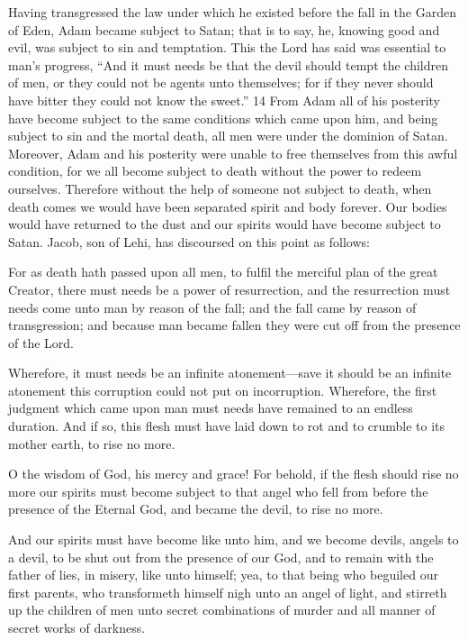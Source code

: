 Having transgressed the law under which he existed before the fall in the Garden of Eden,
Adam became subject to Satan; that is to say, he, knowing good and evil, was subject to sin
and temptation. This the Lord has said was essential to man's progress, ``And it must needs be
that the devil should tempt the children of men, or they could not be agents unto themselves;
for if they never should have bitter they could not know the sweet.'' 14 From Adam all of his
posterity have become subject to the same conditions which came upon him, and being
subject to sin and the mortal death, all men were under the dominion of Satan. Moreover,
Adam and his posterity were unable to free themselves from this awful condition, for we all
become subject to death without the power to redeem ourselves. Therefore without the help
of someone not subject to death, when death comes we would have been separated spirit and
body forever. Our bodies would have returned to the dust and our spirits would have become
subject to Satan. Jacob, son of Lehi, has discoursed on this point as follows:

For as death hath passed upon all men, to fulfil the merciful plan of the great Creator, there
must needs be a power of resurrection, and the resurrection must needs come unto man by
reason of the fall; and the fall came by reason of transgression; and because man became
fallen they were cut off from the presence of the Lord.

Wherefore, it must needs be an infinite atonement—save it should be an infinite atonement
this corruption could not put on incorruption. Wherefore, the first judgment which came
upon man must needs have remained to an endless duration. And if so, this flesh must have
laid down to rot and to crumble to its mother earth, to rise no more.

O the wisdom of God, his mercy and grace! For behold, if the flesh should rise no more our
spirits must become subject to that angel who fell from before the presence of the Eternal
God, and became the devil, to rise no more.

And our spirits must have become like unto him, and we become devils, angels to a devil, to
be shut out from the presence of our God, and to remain with the father of lies, in misery, like
unto himself; yea, to that being who beguiled our first parents, who transformeth himself
nigh unto an angel of light, and stirreth up the children of men unto secret combinations of
murder and all manner of secret works of darkness.

